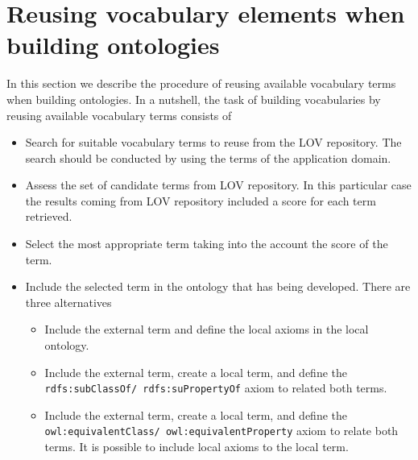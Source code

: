 
 
\section{Reusing vocabulary elements when building ontologies}\label{sec:reuse}
In this section we describe the procedure of reusing available vocabulary terms when building ontologies. In a nutshell, the task of building vocabularies by reusing available vocabulary terms consists of
\begin{itemize}
	\item Search for suitable vocabulary terms to reuse from the LOV repository. The search should be conducted by using the terms of the application domain.
	\item Assess the set of candidate terms from LOV repository. In this particular case the results coming from LOV repository included a score for each term retrieved.
	\item Select the most appropriate term taking into the account the score of the term.
	\item Include the selected term in the ontology that has being developed. There are three alternatives 
	\begin{itemize}
		\item Include the external term and define the local axioms in the local ontology.
		\item Include the external term, create a local term, and define the {\tt rdfs:subClassOf/ rdfs:suPropertyOf} axiom to related both terms.
		\item Include the external term, create a local term, and define the {\tt owl:equivalentClass/ owl:equivalentProperty} axiom to relate both terms. It is possible to include local axioms to the local term.				
	\end{itemize}
\end{itemize}
